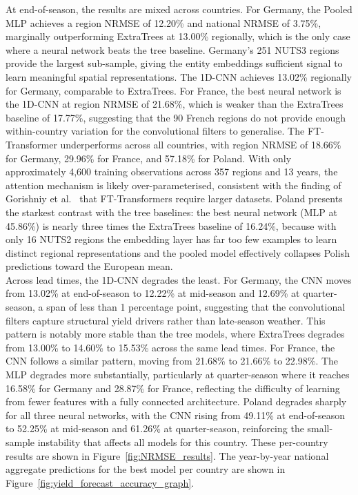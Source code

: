 \documentclass[pdflatex,sn-mathphys-num, oneside, 11pt]{sn-jnl}%
\theoremstyle{thmstyleone}%
\theoremstyle{thmstyletwo}%
\theoremstyle{thmstylethree}%
\begin{document}
At end-of-season, the results are mixed across countries. For Germany, the Pooled MLP achieves a region NRMSE of 12.20\% and national NRMSE of 3.75\%, marginally outperforming ExtraTrees at 13.00\% regionally, which is the only case where a neural network beats the tree baseline. Germany's 251 NUTS3 regions provide the largest sub-sample, giving the entity embeddings sufficient signal to learn meaningful spatial representations. The 1D-CNN achieves 13.02\% regionally for Germany, comparable to ExtraTrees. For France, the best neural network is the 1D-CNN at region NRMSE of 21.68\%, which is weaker than the ExtraTrees baseline of 17.77\%, suggesting that the 90 French regions do not provide enough within-country variation for the convolutional filters to generalise. The FT-Transformer underperforms across all countries, with region NRMSE of 18.66\% for Germany, 29.96\% for France, and 57.18\% for Poland. With only approximately 4,600 training observations across 357 regions and 13 years, the attention mechanism is likely over-parameterised, consistent with the finding of Gorishniy et al.~\cite{bib_gorishniy} that FT-Transformers require larger datasets. Poland presents the starkest contrast with the tree baselines: the best neural network (MLP at 45.86\%) is nearly three times the ExtraTrees baseline of 16.24\%, because with only 16 NUTS2 regions the embedding layer has far too few examples to learn distinct regional representations and the pooled model effectively collapses Polish predictions toward the European mean.\\

Across lead times, the 1D-CNN degrades the least. For Germany, the CNN moves from 13.02\% at end-of-season to 12.22\% at mid-season and 12.69\% at quarter-season, a span of less than 1 percentage point, suggesting that the convolutional filters capture structural yield drivers rather than late-season weather. This pattern is notably more stable than the tree models, where ExtraTrees degrades from 13.00\% to 14.60\% to 15.53\% across the same lead times. For France, the CNN follows a similar pattern, moving from 21.68\% to 21.66\% to 22.98\%. The MLP degrades more substantially, particularly at quarter-season where it reaches 16.58\% for Germany and 28.87\% for France, reflecting the difficulty of learning from fewer features with a fully connected architecture. Poland degrades sharply for all three neural networks, with the CNN rising from 49.11\% at end-of-season to 52.25\% at mid-season and 61.26\% at quarter-season, reinforcing the small-sample instability that affects all models for this country. These per-country results are shown in Figure~\ref{fig:NRMSE_results}. The year-by-year national aggregate predictions for the best model per country are shown in Figure~\ref{fig:yield_forecast_accuracy_graph}.\\
\end{document}
